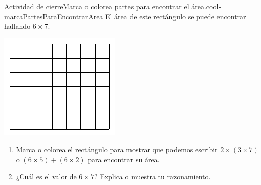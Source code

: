 \documentclass[14pt]{extarticle}
\begin{document}
\begin{project}{Actividad de cierre}{Marca o colorea partes para encontrar el área.}{cool-marcaPartesParaEncontrarArea}%
El área de este rectángulo se puede encontrar hallando \(6 \times 7\).%
\begin{image}{0}{1}{0}{}%
\includegraphics[max width=\linewidth, center]{external/svg-source/tikz-file-153042.pdf}
\end{image}%
%
\begin{enumerate}[label={(\alph*)}]
\item{}Marca o colorea el rectángulo para mostrar que podemos escribir \(2 \times (3 \times 7)\) o \((6 \times 5) + (6 \times 2)\) para encontrar su área.%
\item{}¿Cuál es el valor de \(6 \times 7\)? Explica o muestra tu razonamiento.%
\end{enumerate}
\begin{image}{0}{1}{0}{}%

\end{image}
\end{project}
\end{document}
